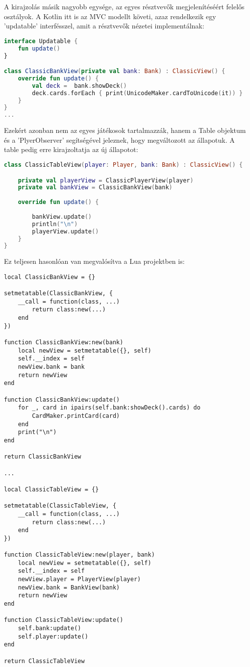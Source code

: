 A kirajzolás másik nagyobb egysége, az egyes résztvevők megjelenítéséért felelős osztályok. A Kotlin itt is az MVC modellt követi, azaz rendelkezik egy 'updatable' interfésszel, amit a résztvevők nézetei implementálnak:
\scriptsize
\begin{lstlisting}[language = Kotlin]
interface Updatable {
	fun update()
}

class ClassicBankView(private val bank: Bank) : ClassicView() {
	override fun update() {
		val deck =  bank.showDeck()
		deck.cards.forEach { print(UnicodeMaker.cardToUnicode(it)) }
	}
}
...

\end{lstlisting}
\normalsize
Ezekért azonban nem az egyes játékosok tartalmazzák, hanem a Table objektum és a 'PlyerObserver' segítségével jeleznek, hogy megváltozott az állapotuk. A table pedig erre kirajzoltatja az új állapotot:
\scriptsize
\begin{lstlisting}[language = Kotlin]
class ClassicTableView(player: Player, bank: Bank) : ClassicView() {

	private val playerView = ClassicPlayerView(player)
	private val bankView = ClassicBankView(bank)
	
	override fun update() {
	
		bankView.update()
		println("\n")
		playerView.update()
	}
}

\end{lstlisting}
\normalsize
\newpage
Ez teljesen hasonlóan van megvalósítva a Lua projektben is:
\scriptsize
\begin{lstlisting}[style=Lua]
local ClassicBankView = {}

setmetatable(ClassicBankView, {
	__call = function(class, ...)
		return class:new(...)
	end
})

function ClassicBankView:new(bank)
	local newView = setmetatable({}, self)
	self.__index = self
	newView.bank = bank
	return newView
end

function ClassicBankView:update()
	for _, card in ipairs(self.bank:showDeck().cards) do
		CardMaker.printCard(card)
	end
	print("\n")
end

return ClassicBankView

...

local ClassicTableView = {}

setmetatable(ClassicTableView, {
	__call = function(class, ...)
		return class:new(...)
	end
})

function ClassicTableView:new(player, bank)
	local newView = setmetatable({}, self)
	self.__index = self
	newView.player = PlayerView(player)
	newView.bank = BankView(bank)
	return newView
end

function ClassicTableView:update()
	self.bank:update()
	self.player:update()
end

return ClassicTableView
\end{lstlisting}
\normalsize

